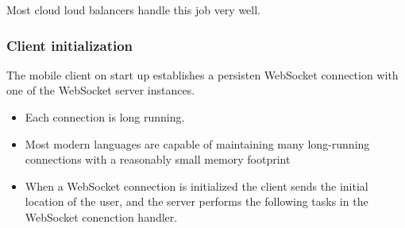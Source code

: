 \documentclass{report}
\theoremstyle{definition}
\let\oldsubsubsection\subsubsection
\renewcommand{\subsubsection}{\oldsubsubsection*}
\begin{document}
Most cloud loud balancers handle this job very well.

\subsubsection{Client initialization}

The mobile client on start up establishes a persisten WebSocket connection with one of the WebSocket server instances.
\begin{itemize}
\item
Each connection is long running.
\item
Most modern languages are capable of maintaining many long-running connections with a reasonably small memory footprint
\item
When a WebSocket connection is initialized the client sends the initial location of the user, and the server performs the following tasks in the WebSocket conenction handler.
\end{itemize}
\end{document}
